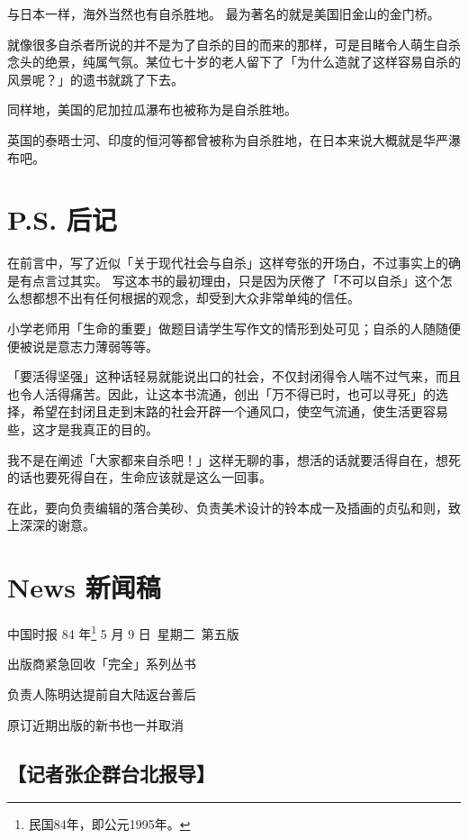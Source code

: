 \documentclass[UTF8]{ctexart}
\begin{document}
与日本一样，海外当然也有自杀胜地。
最为著名的就是美国旧金山的金门桥。

就像很多自杀者所说的并不是为了自杀的目的而来的那样，可是目睹令人萌生自杀念头的绝景，纯属气氛。某位七十岁的老人留下了「为什么造就了这样容易自杀的风景呢？」的遗书就跳了下去。

同样地，美国的尼加拉瓜瀑布也被称为是自杀胜地。

英国的泰晤士河、印度的恒河等都曾被称为自杀胜地，在日本来说大概就是华严瀑布吧。



\newpage

\section{P.S. 后记}

在前言中，写了近似「关于现代社会与自杀」这样夸张的开场白，不过事实上的确是有点言过其实。
写这本书的最初理由，只是因为厌倦了「不可以自杀」这个怎么想都想不出有任何根据的观念，却受到大众非常单纯的信任。

小学老师用「生命的重要」做题目请学生写作文的情形到处可见；自杀的人随随便便被说是意志力薄弱等等。

「要活得坚强」这种话轻易就能说出口的社会，不仅封闭得令人喘不过气来，而且也令人活得痛苦。因此，让这本书流通，创出「万不得已时，也可以寻死」的选择，希望在封闭且走到末路的社会开辟一个通风口，使空气流通，使生活更容易些，这才是我真正的目的。

我不是在阐述「大家都来自杀吧！」这样无聊的事，想活的话就要活得自在，想死的话也要死得自在，生命应该就是这么一回事。

\newpage

在此，要向负责编辑的落合美砂、负责美术设计的铃本成一及插画的贞弘和则，致上深深的谢意。


\newpage

\section{News 新闻稿}

中国时报 84 年\footnote{民国84年，即公元1995年。} 5 月 9 日\ 星期二\ 第五版

出版商紧急回收「完全」系列丛书

负责人陈明达提前自大陆返台善后

原订近期出版的新书也一并取消

\subsection*{【记者张企群台北报导】}
\end{document}

